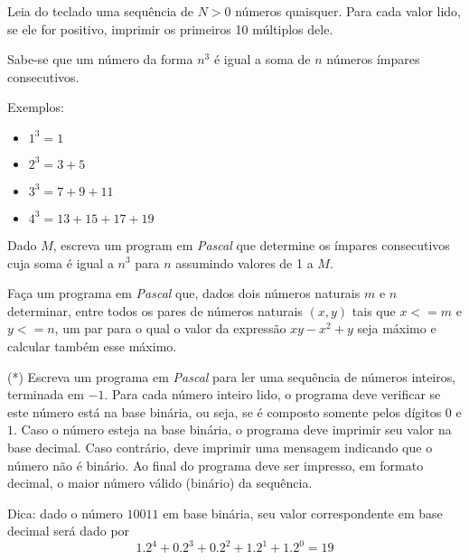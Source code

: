 
\item Leia do teclado uma sequência de  $N > 0$ números quaisquer. Para cada
valor lido, se ele for positivo, imprimir os primeiros 10 múltiplos
dele.


\item Sabe-se que um número da forma $n^3$ é igual a soma de $n$ números
ímpares consecutivos.

Exemplos:
\begin{itemize}
\item
$1^3 = 1$
\item
$2^3 = 3 + 5$
\item
$3^3 = 7 + 9 + 11$
\item
$4^3 = 13 + 15 + 17 + 19$
\end{itemize}

Dado $M$, escreva um program em \emph{Pascal} que determine os ímpares
consecutivos cuja soma é igual a $n^3$ para $n$ assumindo valores de
1 a $M$.

\item Faça um programa em {\em  \emph{Pascal}} que, dados
dois números naturais  $m$ e $n$  determinar,  entre todos  os pares de
números naturais $(x,y)$ tais que $x<=m$ e $y<=n$, um  par para o qual
o valor da expressão $xy - x^2 + y$ seja máximo e calcular também esse
máximo.

\item (*) Escreva um programa em \emph{Pascal} para ler uma sequência de
números inteiros, terminada em $-1$. Para cada número inteiro lido, o programa
deve verificar se este número está na base binária, ou seja, se é composto
somente
pelos dígitos $0$ e $1$. Caso o número esteja na base binária, o programa deve
imprimir seu valor na base decimal. Caso contrário, deve imprimir uma
mensagem indicando que o número não é binário. Ao final do programa deve ser
impresso, em formato decimal, o maior número válido (binário) da sequência.

\vspace*{0.25cm}

\noindent Dica: dado o número $10011$ em base binária, seu valor correspondente
em base decimal será dado por
\begin{equation*}
1.2^4 + 0.2^3 + 0.2^2 + 1.2^1 + 1.2^0 = 19 
\end{equation*}


\vspace*{0.25cm}

